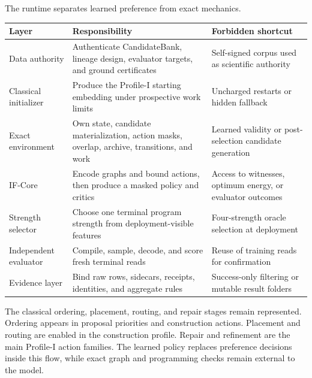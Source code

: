 \documentclass[
  american,
  10pt,
  a4paper,
]{article}
\begin{document}
The runtime separates learned preference from exact mechanics.

\begin{longtable}[]{@{}
  >{\raggedright\arraybackslash}p{}
  >{\raggedright\arraybackslash}p{}
  >{\raggedright\arraybackslash}p{}@{}}
\toprule\noalign{}
\begin{minipage}[b]{\linewidth}\raggedright
Layer
\end{minipage} & \begin{minipage}[b]{\linewidth}\raggedright
Responsibility
\end{minipage} & \begin{minipage}[b]{\linewidth}\raggedright
Forbidden shortcut
\end{minipage} \\
\midrule\noalign{}
\endhead
\bottomrule\noalign{}
\endlastfoot
Data authority & Authenticate CandidateBank, lineage design, evaluator
targets, and ground certificates & Self-signed corpus used as scientific
authority \\
Classical initializer & Produce the Profile-I starting embedding under
prospective work limits & Uncharged restarts or hidden fallback \\
Exact environment & Own state, candidate materialization, action masks,
overlap, archive, transitions, and work & Learned validity or
post-selection candidate generation \\
IF-Core & Encode graphs and bound actions, then produce a masked policy
and critics & Access to witnesses, optimum energy, or evaluator
outcomes \\
Strength selector & Choose one terminal program strength from
deployment-visible features & Four-strength oracle selection at
deployment \\
Independent evaluator & Compile, sample, decode, and score fresh
terminal reads & Reuse of training reads for confirmation \\
Evidence layer & Bind raw rows, sidecars, receipts, identities, and
aggregate rules & Success-only filtering or mutable result folders \\
\end{longtable}

The classical ordering, placement, routing, and repair stages remain
represented. Ordering appears in proposal priorities and construction
actions. Placement and routing are enabled in the construction profile.
Repair and refinement are the main Profile-I action families. The
learned policy replaces preference decisions inside this flow, while
exact graph and programming checks remain external to the model.
\end{document}
